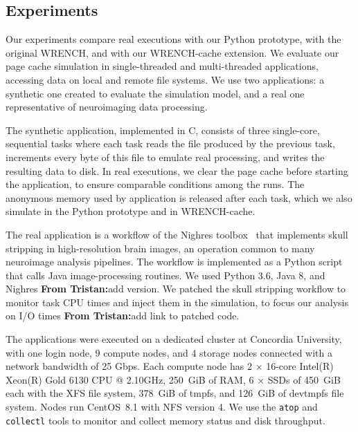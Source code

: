 \documentclass[conference]{IEEEtran}
\newcommand{\tristan}[1]{\color{orange}\textbf{From Tristan:}#1\color{black}}
\newcommand{\wrench}{WRENCH\xspace}
\begin{document}
        \subsection{Experiments}

        Our experiments compare real executions with our Python prototype,
        with the original \wrench, and with our \wrench-cache extension. We
        evaluate our page cache simulation in single-threaded and
        multi-threaded applications, accessing data on local and remote
        file systems. We use two applications: a synthetic one created to
        evaluate the simulation model, and a real one representative of
        neuroimaging data processing.

        The synthetic application, implemented in C, consists of three single-core,
        sequential tasks where each task reads the file produced by the
        previous task, increments every byte of this file to emulate real
        processing, and writes the resulting data to disk. In real
        executions, we clear the page cache before starting the application,
        to ensure comparable conditions among the runs.
        The anonymous memory used by application
        is released after each task, which we also simulate in the Python prototype and in WRENCH-cache.
        
        The real application is a workflow of the Nighres
        toolbox~\cite{huntenburg2018nighres} that implements skull
        stripping in high-resolution brain images, an operation common to
        many neuroimage analysis pipelines. The workflow is implemented as a Python
        script that calls Java image-processing routines. We used Python
        3.6, Java 8, and Nighres \tristan{add version}. We patched the
        skull stripping workflow to monitor task CPU times and inject them
        in the simulation, to focus our analysis on I/O times \tristan{add
        link to patched code}. 

        The applications were executed on a dedicated cluster at
        Concordia University, with one login node, 9 compute nodes, and 4
        storage nodes connected with a network bandwidth of 25 Gbps. Each
        compute node has 2 $\times$ 16-core Intel(R) Xeon(R) Gold 6130 CPU
        @ 2.10GHz, 250~GiB of RAM, 6 $\times$ SSDs of 450~GiB each with the XFS
        file system, 378~GiB of tmpfs, and 126~GiB of devtmpfs file system.
        Nodes run CentOS~8.1 with NFS version 4. We use the \texttt{atop}
        and \texttt{collectl} tools to monitor and collect memory status
        and disk throughput.
\end{document}
